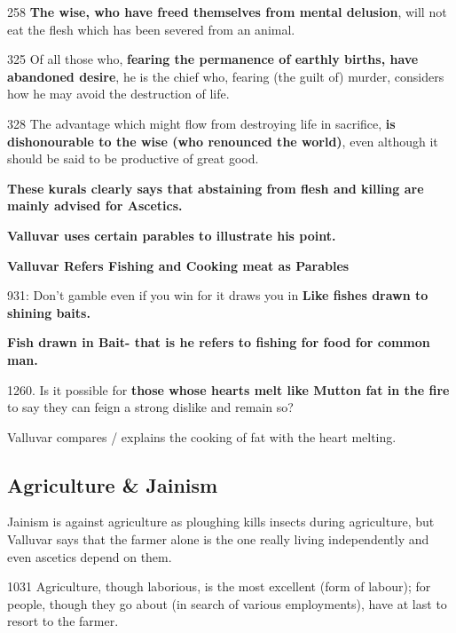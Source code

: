 258 \textbf{The wise, who have freed themselves from mental delusion}, will not eat the flesh which has been severed from an animal.

 325 Of all those who, \textbf{fearing the permanence of earthly births, have abandoned desire}, he is the chief who, fearing (the guilt of) murder, considers how he may avoid the destruction of life.

328 The advantage which might flow from destroying life in sacrifice, \textbf{is dishonourable to the wise (who renounced the world)}, even although it should be said to be productive of great good.

\textbf{These kurals clearly says that abstaining from flesh and killing are mainly advised for Ascetics.}

\textbf{Valluvar uses certain parables to illustrate his point.}

\textbf{Valluvar Refers Fishing and Cooking meat as Parables}

931: Don’t gamble even if you win for it draws you in \textbf{Like fishes drawn to shining baits.}

\textbf{Fish drawn in Bait- that is he refers to fishing for food for common man.}

1260. Is it possible for \textbf{those whose hearts melt like Mutton fat in the fire} to say they can feign a strong dislike and remain so?

Valluvar compares / explains the cooking of fat with the heart melting.


\subsection*{Agriculture \& Jainism}

Jainism is against agriculture as ploughing kills insects during agriculture, but Valluvar says that the farmer alone is the one really living independently and even ascetics depend on them.

1031 Agriculture, though laborious, is the most excellent (form of labour); for people, though they go about (in search of various employments), have at last to resort to the farmer.

